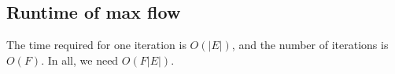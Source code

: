 \subsection{Runtime of max flow}
The time required for one iteration is \(O\left(\left|E\right|\right)\), and the number of iterations is \(O(F)\). In all, we need \(O\left(F\left|E\right|\right)\).
